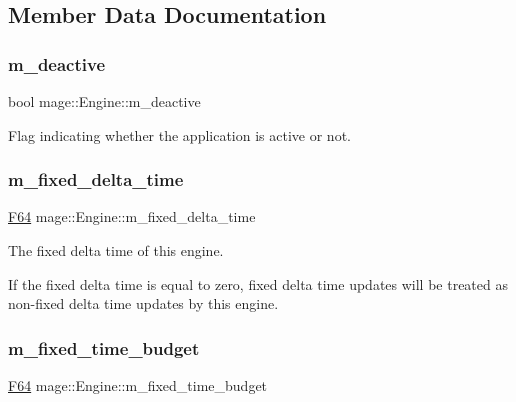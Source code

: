 \subsection{Member Data Documentation}
\hypertarget{classmage_1_1_engine_ab8a4b0157403708ae7d1d018a95b4c63}{}\label{classmage_1_1_engine_ab8a4b0157403708ae7d1d018a95b4c63} 
\subsubsection{\texorpdfstring{m\+\_\+deactive}{m\_deactive}}
{\footnotesize\ttfamily bool mage\+::\+Engine\+::m\+\_\+deactive\hspace{0.3cm}{\ttfamily [private]}}

Flag indicating whether the application is active or not. \hypertarget{classmage_1_1_engine_a95557e1b6cba52b393c94d80d80bea4c}{}\label{classmage_1_1_engine_a95557e1b6cba52b393c94d80d80bea4c} 
\subsubsection{\texorpdfstring{m\+\_\+fixed\+\_\+delta\+\_\+time}{m\_fixed\_delta\_time}}
{\footnotesize\ttfamily \hyperlink{namespacemage_ad26233bbec640deda836e572c1a23708}{F64} mage\+::\+Engine\+::m\+\_\+fixed\+\_\+delta\+\_\+time\hspace{0.3cm}{\ttfamily [private]}}

The fixed delta time of this engine.

If the fixed delta time is equal to zero, fixed delta time updates will be treated as non-\/fixed delta time updates by this engine. \hypertarget{classmage_1_1_engine_ad46dd72279d9d86b96d1b907575765e9}{}\label{classmage_1_1_engine_ad46dd72279d9d86b96d1b907575765e9} 
\subsubsection{\texorpdfstring{m\+\_\+fixed\+\_\+time\+\_\+budget}{m\_fixed\_time\_budget}}
{\footnotesize\ttfamily \hyperlink{namespacemage_ad26233bbec640deda836e572c1a23708}{F64} mage\+::\+Engine\+::m\+\_\+fixed\+\_\+time\+\_\+budget\hspace{0.3cm}{\ttfamily [private]}}

